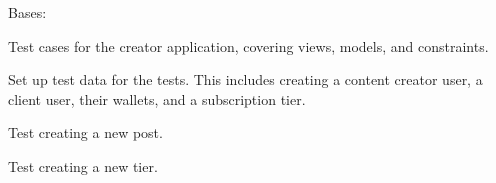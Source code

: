 \documentclass[letterpaper,10pt,english]{sphinxmanual}
\begin{document}
\begin{fulllineitems}
\label{\detokenize{modules/tests:creator.tests.CreatorTests}}
\pysigstartsignatures
{}
\pysigstopsignatures
\sphinxAtStartPar
Bases: 

\sphinxAtStartPar
Test cases for the creator application, covering views, models, and constraints.

\begin{fulllineitems}
\label{\detokenize{modules/tests:creator.tests.CreatorTests.setUp}}
\pysigstartsignatures
{}
\pysigstopsignatures
\sphinxAtStartPar
Set up test data for the tests. This includes creating a content creator user,
a client user, their wallets, and a subscription tier.

\end{fulllineitems}


\begin{fulllineitems}
\label{\detokenize{modules/tests:creator.tests.CreatorTests.test_create_post}}
\pysigstartsignatures
{}
\pysigstopsignatures
\sphinxAtStartPar
Test creating a new post.

\end{fulllineitems}


\begin{fulllineitems}
\label{\detokenize{modules/tests:creator.tests.CreatorTests.test_create_tier}}
\pysigstartsignatures
{}
\pysigstopsignatures
\sphinxAtStartPar
Test creating a new tier.

\end{fulllineitems}


\end{fulllineitems}
\end{document}
